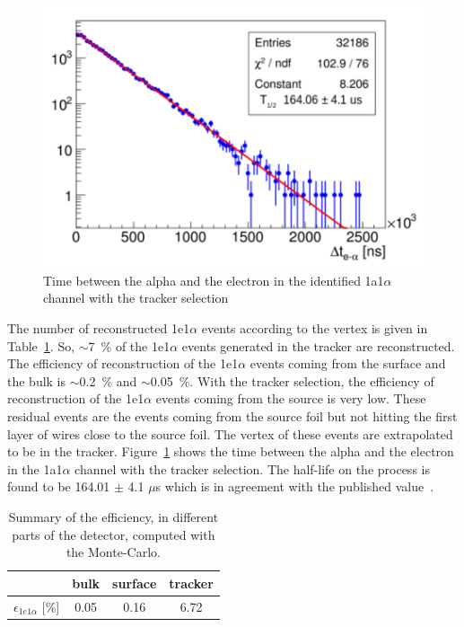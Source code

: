 \documentclass[main.tex]{subfiles}
\begin{document}
\begin{figure}[h!]
\begin{center}
\includegraphics[scale=0.6]{pictures/Chap5/delta_t_tracker_selection_tracker.pdf}
\caption{Time between the alpha and the electron in the identified 1a1$\alpha$ channel with the tracker selection}
\label{delta_t_tracker_selection}
\end{center}
\end{figure}


\bigskip


\noindent The number of reconstructed 1e1$\alpha$ events according to the vertex is given in Table~\ref{efficiency_different_parts_tracker}. So, $\sim$7~\% of the 1e1$\alpha$ events generated in the tracker are reconstructed. The efficiency of reconstruction of the 1e1$\alpha$ events coming from the surface and the bulk is $\sim$0.2~\% and $\sim$0.05~\%. With the tracker selection, the efficiency of reconstruction of the 1e1$\alpha$ events coming from the source is very low. These residual events are the events coming from the source foil but not hitting the first layer of wires close to the source foil. The vertex of these events are extrapolated to be in the tracker. Figure~\ref{delta_t_tracker_selection} shows the time between the alpha and the electron in the 1a1$\alpha$ channel with the tracker selection. The half-life on the process is found to be 164.01 $\pm$ 4.1 $\mu$s which is in agreement with the published value~\cite{NuclearDataSheet210}. 


\begin{table}[h!]
\begin{center}
\begin{tabular}{c|c|c|c}
           & bulk   & surface & tracker \\
\hline
$\epsilon_{1e1\alpha}$ [\%] & 0.05 & 0.16  & 6.72 \\
\hline
\end{tabular}
\end{center}
\caption{Summary of the efficiency, in different parts of the detector, computed with the Monte-Carlo.}
\label{efficiency_different_parts_tracker}
\end{table}
\end{document}
